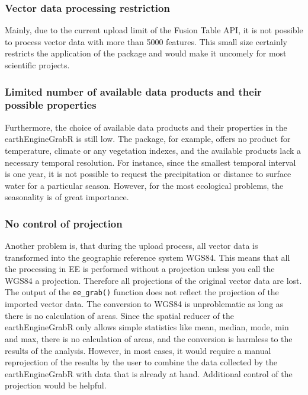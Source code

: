\subsubsection{Vector data processing restriction}

Mainly, due to the current upload limit of the Fusion Table API, it is not possible to process vector data with more than 5000 features. This small size certainly restricts the application of the package and would make it uncomely for most scientific projects. 

\subsubsection{Limited number of available data products and their possible properties}

Furthermore, the choice of available data products and their properties in the earthEngineGrabR is still low. The package, for example, offers no product for temperature, climate or any vegetation indexes, and the available products lack a necessary temporal resolution. For instance, since the smallest temporal interval is one year, it is not possible to request the precipitation or distance to surface water for a particular season. However, for the most ecological problems, the seasonality is of great importance.

\subsubsection{No control of projection}

Another problem is, that during the upload process, all vector data is transformed into the geographic reference system WGS84. This means that all the processing in EE is performed without a projection unless you call the WGS84 a projection. Therefore all projections of the original vector data are lost. The output of the \texttt{ee\_grab()} function does not reflect the projection of the imported vector data. The conversion to WGS84 is unproblematic as long as there is no calculation of areas. Since the spatial reducer of the earthEngineGrabR only allows simple statistics like mean, median, mode, min and max, there is no calculation of areas, and the conversion is harmless to the results of the analysis. However, in most cases, it would require a manual reprojection of the results by the user to combine the data collected by the earthEngineGrabR with data that is already at hand. Additional control of the projection would be helpful.

